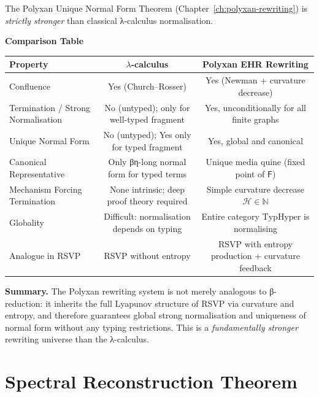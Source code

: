 \begin{mdframed}[backgroundcolor=gray!10,linewidth=0.5pt]
The Polyxan Unique Normal Form Theorem (Chapter~\ref{ch:polyxan-rewriting})
is \emph{strictly stronger} than classical λ-calculus normalisation.

\bigskip

\noindent\textbf{Comparison Table}

\begin{center}
\begin{tabular}{l|c|c}
\textbf{Property}
 & \textbf{$\lambda$-calculus} 
 & \textbf{Polyxan EHR Rewriting} \\ \hline\hline
Confluence 
 & Yes (Church–Rosser) 
 & Yes (Newman + curvature decrease) \\ \hline
Termination / Strong Normalisation
 & No (untyped); only for well-typed fragment 
 & Yes, unconditionally for all finite graphs \\ \hline
Unique Normal Form
 & No (untyped); Yes only for typed fragment 
 & Yes, global and canonical \\ \hline
Canonical Representative
 & Only βη-long normal form for typed terms 
 & Unique media quine (fixed point of $\mathsf{F}$) \\ \hline
Mechanism Forcing Termination
 & None intrinsic; deep proof theory required 
 & Simple curvature decrease $\mathcal{H} \in \mathbb{N}$ \\ \hline
Globality
 & Difficult: normalisation depends on typing 
 & Entire category $\mathrm{TypHyper}$ is normalising \\ \hline
Analogue in RSVP
 & RSVP without entropy 
 & RSVP with entropy production + curvature feedback \\
\end{tabular}
\end{center}

\medskip

\noindent
\textbf{Summary.}
The Polyxan rewriting system is not merely analogous to β-reduction:
it inherits the full Lyapunov structure of RSVP via curvature and entropy,
and therefore guarantees global strong normalisation and uniqueness of normal form
without any typing restrictions.  
This is a \emph{fundamentally stronger} rewriting universe than the λ-calculus.
\end{mdframed}

\section{Spectral Reconstruction Theorem}

